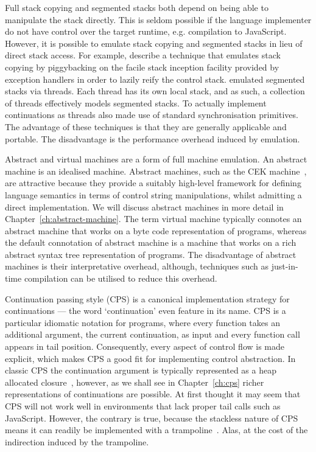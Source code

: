 \documentclass[12pt,phd,lfcs,twoside,openright,logo,leftchapter,normalheadings]{infthesis}
\theoremstyle{plain}
\theoremstyle{definition}
\begin{document}
Full stack copying and segmented stacks both depend on being able to
manipulate the stack directly. This is seldom possible if the language
implementer do not have control over the target runtime,
e.g. compilation to JavaScript. However, it is possible to emulate
stack copying and segmented stacks in lieu of direct stack access. For
example, \citet{PettyjohnCMKF05} describe a technique that emulates
stack copying by piggybacking on the facile stack inception facility
provided by exception handlers in order to lazily reify the control
stack.
%
\citet{KumarBD98} emulated segmented stacks via threads. Each thread
has its own local stack, and as such, a collection of threads
effectively models segmented stacks. To actually implement
continuations as threads \citeauthor{KumarBD98} also made use of
standard synchronisation primitives.
%
The advantage of these techniques is that they are generally
applicable and portable. The disadvantage is the performance overhead
induced by emulation.

Abstract and virtual machines are a form of full machine emulation. An
abstract machine is an idealised machine. Abstract machines, such as
the CEK machine~\cite{FelleisenF86}, are attractive because they
provide a suitably high-level framework for defining language
semantics in terms of control string manipulations, whilst admitting a
direct implementation.
%
We will discuss abstract machines in more detail in
Chapter~\ref{ch:abstract-machine}.
%
The term virtual machine typically connotes an abstract machine that
works on a byte code representation of programs, whereas the default
connotation of abstract machine is a machine that works on a rich
abstract syntax tree representation of programs.
%
The disadvantage of abstract machines is their interpretative
overhead, although, techniques such as just-in-time compilation can be
utilised to reduce this overhead.

Continuation passing style (CPS) is a canonical implementation
strategy for continuations --- the word `continuation' even feature in
its name.
%
CPS is a particular idiomatic notation for programs, where every
function takes an additional argument, the current continuation, as
input and every function call appears in tail position. Consequently,
every aspect of control flow is made explicit, which makes CPS a good
fit for implementing control abstraction. In classic CPS the
continuation argument is typically represented as a heap allocated
closure~\cite{Appel92}, however, as we shall see in
Chapter~\ref{ch:cps} richer representations of continuations are
possible.
%
At first thought it may seem that CPS will not work well in
environments that lack proper tail calls such as JavaScript. However,
the contrary is true, because the stackless nature of CPS means it can
readily be implemented with a trampoline~\cite{GanzFW99}. Alas, at the
cost of the indirection induced by the trampoline.
\end{document}
